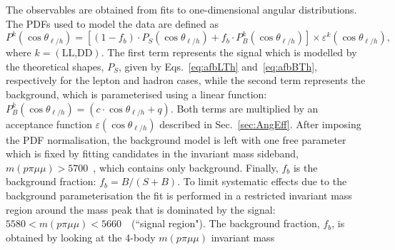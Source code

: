 The observables are obtained from fits to one-dimensional angular distributions.
%
%
The PDFs used to model the data are defined as
%
\begin{equation}
P^k(\cos\theta_{\ell/h}) = [(1-f_b) \cdot P_S(\cos\theta_{\ell/h})  + 
		f_b  \cdot  P_B^k(\cos\theta_{\ell/h}) ] \times \varepsilon^k(\cos \theta_{\ell/h}),
\end{equation}
%
where $k=(\text{LL,DD})$. The first term represents the signal which is modelled by the theoretical shapes, $P_S$, 
given by Eqs.~\ref{eq:afbLTh} and~\ref{eq:afbBTh}, respectively for the lepton and hadron cases, while the second 
term represents the background, which is parameterised using a linear function: 
\mbox{$P_B^k(\cos\theta_{\ell/h}) = (c \cdot \cos\theta_{\ell/h}+q)$}. Both terms are multiplied by an acceptance 
function $\varepsilon( \cos\theta_{\ell/h})$ described in Sec.~\ref{sec:AngEff}. After imposing the PDF normalisation, the background model
is left with one free parameter which is fixed by fitting candidates in the \Lb invariant mass sideband, \mbox{$m(p\pi\mu\mu) > 5700$~\mevcc}, 
which contains only background. Finally, $f_b$ is the background fraction: $f_b = B/(S+B)$.
To limit systematic effects due to the background parameterisation
the fit is performed in a restricted invariant mass region around the \Lb mass peak that is dominated by the signal:
$5580 < m(p\pi\mu\mu) < 5660$~\mevcc ~(``signal region").
%
The background fraction, $f_b$, is obtained by looking at the 4-body $m(p\pi\mu\mu)$ invariant mass
